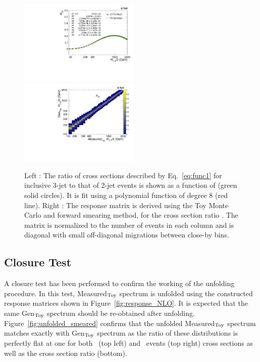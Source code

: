 \begin{figure}[!htbp]
 \begin{center}
 \hspace*{-5mm}\includegraphics[width=0.51\textwidth]{Plots_HT_2_150/Extrapolate_Theory_Ratio_32_funcII.pdf}%
  ~~\includegraphics[width=0.51\textwidth]{Plots_HT_2_150/Normalized_Response_Matrix_NLO_ratio_32_column_3.pdf}
  \caption{Left : The ratio of cross sections described by Eq.~\ref{eq:func1} for inclusive 3-jet to that of 2-jet events is shown as a function of \httwo (green solid circles). It is fit using a polynomial function of degree 8 (red line). Right : The response matrix is derived using the Toy Monte Carlo and forward smearing method, for the cross section ratio \rations. The matrix is normalized to the number of events in each column and is diagonal with small off-diagonal migrations between close-by \httwo bins.}
 \label{fig:ratio_fit}
 \end{center}
\end{figure}

\subsection{Closure Test}
A closure test has been performed to confirm the working of the unfolding procedure. In this test, Measured$_{\rm Toy}$ spectrum is unfolded using the constructed response matrices shown in Figure~\ref{fig:response_NLO}. It is expected that the same Gen$_{\rm Toy}$ spectrum should be re-obtained after unfolding. Figure~\ref{fig:unfolded_smeared} confirms that the unfolded Measured$_{\rm Toy}$ spectrum matches exactly with Gen$_{\rm Toy}$ spectrum as the ratio of these distributions is perfectly flat at one for both \njt~(top left) and \njth~events (top right) cross sections as well as the cross section ratio \ratio (bottom).

